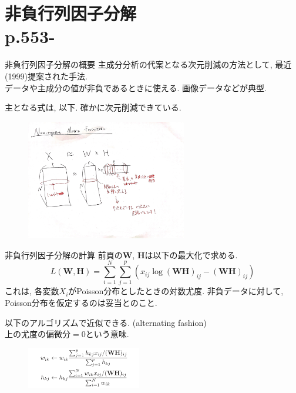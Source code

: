 \documentclass[dvipdfmx,8pt]{beamer}
\begin{document}
  \section{非負行列因子分解\\p.553-}
  \begin{frame}{非負行列因子分解の概要}
    主成分分析の代案となる次元削減の方法として, 最近(1999)提案された手法. \\
    データや主成分の値が非負であるときに使える. 画像データなどが典型.

    主となる式は, 以下. 確かに次元削減できている.
    \begin{figure}[htb]
      \centering
      \includegraphics[width=7cm,clip]{images/nmf-overview.jpg}
    \end{figure}
  \end{frame}
  \begin{frame}{非負行列因子分解の計算}
    前頁の$\textbf{W}$, $\textbf{H}$は以下の最大化で求める.
    \[
      L(\textbf{W}, \textbf{H})=\sum_{i=1}^N\sum_{j=1}^p\left(x_{ij}\log(\textbf{WH})_{ij}-(\textbf{WH})_{ij}\right)
    \]
    これは, 各変数$X_i$がPoisson分布としたときの対数尤度.
    非負データに対して, Poisson分布を仮定するのは妥当とのこと.

    以下のアルゴリズムで近似できる. (alternating fashion)\\
    上の尤度の偏微分$=0$という意味.
    \begin{figure}[htb]
      \centering
      \includegraphics[width=5cm,clip]{images/nnmf.png}
    \end{figure}
  \end{frame}
\end{document}
